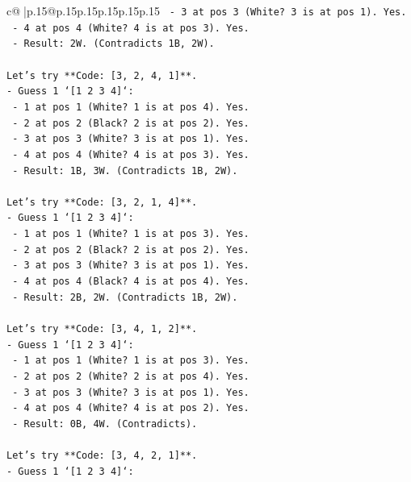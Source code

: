 \documentclass{article}
\begin{document}
{\begin{supertabular}{c@{$\;$}|p{.15\linewidth}@{}p{.15\linewidth}p{.15\linewidth}p{.15\linewidth}p{.15\linewidth}p{.15\linewidth}}
{{{\texttt{  {-} 3 at pos 3 (White? 3 is at pos 1). Yes.} \\
\texttt{  {-} 4 at pos 4 (White? 4 is at pos 3). Yes.} \\
\texttt{  {-} Result: 2W. (Contradicts 1B, 2W).} \\
\\ 
\texttt{Let's try **Code: {[}3, 2, 4, 1{]}**.} \\
\texttt{{-} Guess 1 `{[}1 2 3 4{]}`:} \\
\texttt{  {-} 1 at pos 1 (White? 1 is at pos 4). Yes.} \\
\texttt{  {-} 2 at pos 2 (Black? 2 is at pos 2). Yes.} \\
\texttt{  {-} 3 at pos 3 (White? 3 is at pos 1). Yes.} \\
\texttt{  {-} 4 at pos 4 (White? 4 is at pos 3). Yes.} \\
\texttt{  {-} Result: 1B, 3W. (Contradicts 1B, 2W).} \\
\\ 
\texttt{Let's try **Code: {[}3, 2, 1, 4{]}**.} \\
\texttt{{-} Guess 1 `{[}1 2 3 4{]}`:} \\
\texttt{  {-} 1 at pos 1 (White? 1 is at pos 3). Yes.} \\
\texttt{  {-} 2 at pos 2 (Black? 2 is at pos 2). Yes.} \\
\texttt{  {-} 3 at pos 3 (White? 3 is at pos 1). Yes.} \\
\texttt{  {-} 4 at pos 4 (Black? 4 is at pos 4). Yes.} \\
\texttt{  {-} Result: 2B, 2W. (Contradicts 1B, 2W).} \\
\\ 
\texttt{Let's try **Code: {[}3, 4, 1, 2{]}**.} \\
\texttt{{-} Guess 1 `{[}1 2 3 4{]}`:} \\
\texttt{  {-} 1 at pos 1 (White? 1 is at pos 3). Yes.} \\
\texttt{  {-} 2 at pos 2 (White? 2 is at pos 4). Yes.} \\
\texttt{  {-} 3 at pos 3 (White? 3 is at pos 1). Yes.} \\
\texttt{  {-} 4 at pos 4 (White? 4 is at pos 2). Yes.} \\
\texttt{  {-} Result: 0B, 4W. (Contradicts).} \\
\\ 
\texttt{Let's try **Code: {[}3, 4, 2, 1{]}**.} \\
\texttt{{-} Guess 1 `{[}1 2 3 4{]}`:} \\
}}}
\end{supertabular}}
\end{document}
